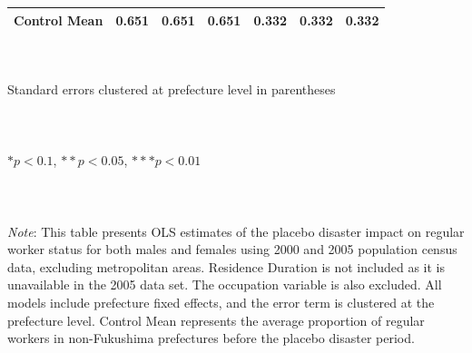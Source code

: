 \documentclass[serif, aspectratio=169]{beamer}
\begin{document}
\begin{frame}[label=regular_placebo]
\begin{table}[htbp]
\begin{tabular}{@{}l*{6}{c}@{}}
Control Mean&    0.651         &    0.651         &    0.651         &    0.332         &    0.332         &    0.332         \\
\bottomrule
\end{tabular}
\\\\{\linewidth}{\tiny Standard errors clustered at prefecture level in parentheses}\\\\
\\\\{\linewidth}{\tiny $*p<0.1$, $**p<0.05$, $***p<0.01$}\\\\
\\\\{\linewidth}{\tiny \textit{Note}: This table presents OLS estimates of the placebo disaster impact on regular worker status for both males and females using 2000 and 2005 population census data, excluding metropolitan areas. Residence Duration is not included as it is unavailable in the 2005 data set. The occupation variable is also excluded. All models include prefecture fixed effects, and the error term is clustered at the prefecture level. Control Mean represents the average proportion of regular workers in non-Fukushima prefectures before the placebo disaster period.}
\end{table}


\end{frame}

\end{document}
